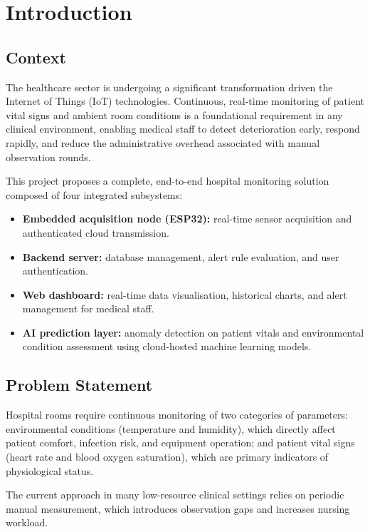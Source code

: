 \chapter{Introduction}

\section{Context}

The healthcare sector is undergoing a significant transformation driven the Internet of Things (IoT) technologies.
Continuous, real-time monitoring of patient vital signs and ambient room conditions is a foundational requirement in any clinical environment, enabling medical staff to detect deterioration early, respond rapidly, and reduce the administrative overhead associated with manual observation rounds.

This project proposes a complete, end-to-end hospital monitoring solution composed
of four integrated subsystems:

\begin{itemize}
	\item \textbf{Embedded acquisition node (ESP32):} real-time sensor acquisition and authenticated cloud transmission.
	\item \textbf{Backend server:} database management, alert rule evaluation, and
	      user authentication.
	\item \textbf{Web dashboard:} real-time data visualisation, historical charts,
	      and alert management for medical staff.
	\item \textbf{AI prediction layer:} anomaly detection on patient vitals and
	      environmental condition assessment using cloud-hosted machine learning models.
\end{itemize}

\section{Problem Statement}

Hospital rooms require continuous monitoring of two categories of parameters:
environmental conditions (temperature and humidity), which directly affect patient
comfort, infection risk, and equipment operation; and patient vital signs (heart rate
and blood oxygen saturation), which are primary indicators of physiological status.

The current approach in many low-resource clinical settings relies on periodic manual
measurement, which introduces observation gaps and increases nursing workload.


